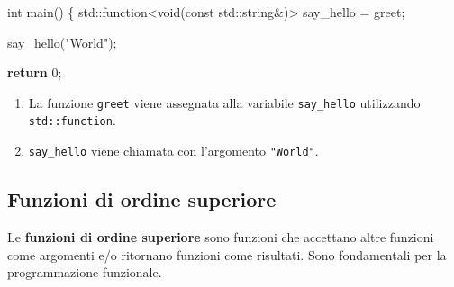 \documentclass[
  letterpaper,
]{scrbook}
\newenvironment{Shaded}{\begin{snugshade}}{\end{snugshade}}
\newcommand{\AttributeTok}[1]{\textcolor[rgb]{0.40,0.45,0.13}{#1}}
\newcommand{\BuiltInTok}[1]{\textcolor[rgb]{0.00,0.23,0.31}{#1}}
\newcommand{\ControlFlowTok}[1]{\textcolor[rgb]{0.00,0.23,0.31}{\textbf{#1}}}
\newcommand{\DataTypeTok}[1]{\textcolor[rgb]{0.68,0.00,0.00}{#1}}
\newcommand{\DecValTok}[1]{\textcolor[rgb]{0.68,0.00,0.00}{#1}}
\newcommand{\NormalTok}[1]{\textcolor[rgb]{0.00,0.23,0.31}{#1}}
\newcommand{\OperatorTok}[1]{\textcolor[rgb]{0.37,0.37,0.37}{#1}}
\newcommand{\StringTok}[1]{\textcolor[rgb]{0.13,0.47,0.30}{#1}}
\providecommand{\tightlist}{%
  \setlength{\itemsep}{0pt}\setlength{\parskip}{0pt}}\usepackage{longtable,booktabs,array}
\newcommand*\circled[1]{\tikz[baseline=(char.base)]{
          \node[shape=circle,draw,inner sep=1pt] (char) {{\scriptsize#1}};}}
\begin{document}
\begin{itemize}
\begin{Shaded}
\begin{Highlighting}[]
\DataTypeTok{int}\NormalTok{ main}\OperatorTok{()} \OperatorTok{\{}
  \BuiltInTok{std::}\NormalTok{function}\OperatorTok{\textless{}}\DataTypeTok{void}\OperatorTok{(}\AttributeTok{const} \BuiltInTok{std::}\NormalTok{string}\OperatorTok{\&)\textgreater{}}\NormalTok{ say\_hello }\OperatorTok{=}\NormalTok{ greet}\OperatorTok{;} \hspace*{\fill}\NormalTok{\circled{1}}

\NormalTok{  say\_hello}\OperatorTok{(}\StringTok{"World"}\OperatorTok{);} \hspace*{\fill}\NormalTok{\circled{2}}

  \ControlFlowTok{return} \DecValTok{0}\OperatorTok{;}
\end{Highlighting}
\end{Shaded}
\end{itemize}

\begin{enumerate}
\def\labelenumi{\arabic{enumi}.}
\tightlist
\item
  La funzione \texttt{greet} viene assegnata alla variabile
  \texttt{say\_hello} utilizzando \texttt{std::function}.
\item
  \texttt{say\_hello} viene chiamata con l'argomento \texttt{"World"}.
\end{enumerate}

\subsection{Funzioni di ordine
superiore}\label{funzioni-di-ordine-superiore}

Le \textbf{funzioni di ordine superiore} sono funzioni che accettano
altre funzioni come argomenti e/o ritornano funzioni come risultati.
Sono fondamentali per la programmazione funzionale.
\end{document}
